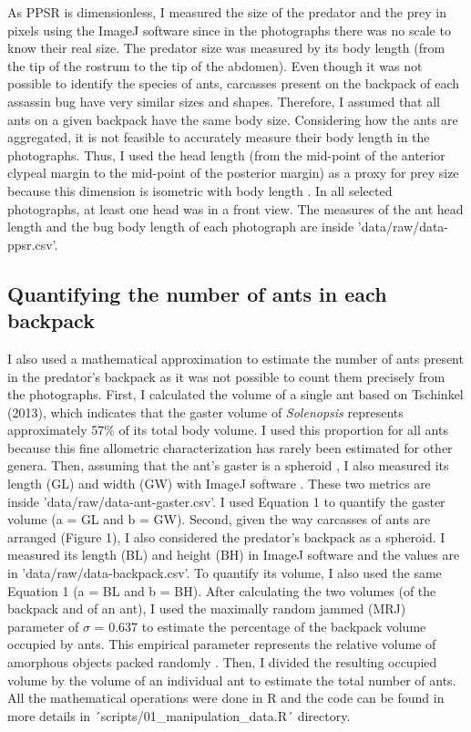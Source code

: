 \documentclass{article}
\begin{document}
As PPSR is dimensionless, I measured the size of the predator and the prey in pixels using the ImageJ software \cite{abramoff2004image} since in the photographs there was no scale to know their real size. The predator size was measured by its body length (from the tip of the rostrum to the tip of the abdomen). Even though it was not possible to identify the species of ants, carcasses present on the backpack of each assassin bug have very similar sizes and shapes. Therefore, I assumed that all ants on a given backpack have the same body size. Considering how the ants are aggregated, it is not feasible to accurately measure their body length in the photographs. Thus, I used the head length (from the mid-point of the anterior clypeal margin to the mid-point of the posterior margin) as a proxy for prey size because this dimension is isometric with body length \cite{tschinkel2013morphometry}. In all selected photographs, at least one head was in a front view. The measures of the ant head length and the bug body length of each photograph are inside 'data/raw/data-ppsr.csv'. 

\subsection{Quantifying the number of ants in each backpack}

I also used a mathematical approximation to estimate the number of ants present in the predator's backpack as it was not possible to count them precisely from the photographs. First, I calculated the volume of a single ant based on Tschinkel (2013), which indicates that the gaster volume of \textit{Solenopsis} represents approximately 57\% of its total body volume. I used this proportion for all ants because this fine allometric characterization has rarely been estimated for other genera. Then, assuming that the ant's gaster is a spheroid \cite{tschinkel2013morphometry}, I also measured its length (GL) and width (GW) with ImageJ software \cite{abramoff2004image}. These two metrics are inside 'data/raw/data-ant-gaster.csv'. I used Equation 1 to quantify the gaster volume (a = GL and b = GW). Second, given the way carcasses of ants are arranged (Figure 1), I also considered the predator's backpack as a spheroid. I measured its length (BL) and height (BH) in ImageJ software \cite{abramoff2004image} and the values are in 'data/raw/data-backpack.csv'. To quantify its volume, I also used the same Equation 1 (a = BL and b = BH). After calculating the two volumes (of the backpack and of an ant), I used the maximally random jammed (MRJ) parameter of $\sigma$ = 0.637 \cite{donev2004improving} to estimate the percentage of the backpack volume occupied by ants. This empirical parameter represents the relative volume of amorphous objects packed randomly \cite{donev2004improving}. Then, I divided the resulting occupied volume by the volume of an individual ant to estimate the total number of ants. All the mathematical operations were done in R \cite{rstudio} and the code can be found in more details in ´scripts/01\_manipulation\_data.R´ directory.
\end{document}
